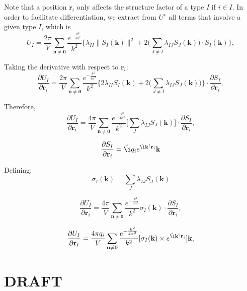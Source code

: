 \documentclass[11pt]{article}
\newcommand{\vt}[1]{\boldsymbol{\mathbf{#1}}}           %
\newcommand{\tr}[1]{#1^\text{t}}                        %
\newcommand{\im}{\hat{\i}}                              %
\begin{document}
Note that a position $\vt r_i$ only affects the structure factor of a type $I$ if $i \in I$. In order to facilitate differentiation, we extract from $U^\star$ all terms that involve a given type $I$, which is
\begin{equation*}
U_I = \frac{2\pi}{V}\sum_{\vt n \neq \vt 0} \frac{e^{-\frac{k^2}{4\alpha^2}}}{k^2} \bigg\{\lambda_{II} \|S_I(\vt k)\|^2 + 2 \bigg(\sum_{J \neq I} \lambda_{IJ} S_J(\vt k)\bigg) \cdot S_I(\vt k) \bigg\},
\end{equation*}

Taking the derivative with respect to $\vt r_i$:
\begin{equation*}
\frac{\partial U_I}{\partial \vt r_i} = \frac{2\pi}{V}\sum_{\vt n \neq \vt 0} \frac{e^{-\frac{k^2}{4\alpha^2}}}{k^2} \bigg\{2 \lambda_{II} S_I(\vt k) + 2 \bigg(\sum_{J \neq I} \lambda_{IJ} S_J(\vt k)\bigg) \bigg\}  \cdot \frac{\partial S_I}{\partial \vt r_i},
\end{equation*}

Therefore,
\begin{equation*}
\frac{\partial U_I}{\partial \vt r_i} = \frac{4\pi}{V} \sum_{\vt n \neq \vt 0} \frac{e^{-\frac{k^2}{4\alpha^2}}}{k^2} \bigg[ \sum_J \lambda_{IJ} S_J(\vt k) \bigg] \cdot \frac{\partial S_I}{\partial \vt r_i},
\end{equation*}

\begin{equation*}
\frac{\partial S_I}{\partial \vt r_i} = \im q_i e^{\im \tr{\vt k}{\vt r}_i}{\vt k}
\end{equation*}

Defining:
\begin{equation*}
\sigma_I(\vt k) = \sum_J \lambda_{IJ} S_J(\vt k)
\end{equation*}

\begin{equation*}
\frac{\partial U_I}{\partial \vt r_i} = \frac{4\pi}{V} \sum_{\vt n \neq \vt 0} \frac{e^{-\frac{k^2}{4\alpha^2}}}{k^2} \sigma_I(\vt k) \cdot \frac{\partial S_I}{\partial \vt r_i},
\end{equation*}

\begin{equation*}
\frac{\partial U_I}{\partial \vt r_i} = \frac{4\pi q_i}{V} \sum_{\vt n \neq \vt 0} \frac{e^{-\frac{k^2}{4\alpha^2}}}{k^2} [\sigma_I(\vt k) \times e^{\im \tr{\vt k}{\vt r}_i}]{\vt k},
\end{equation*}

\section{DRAFT}
\end{document}

